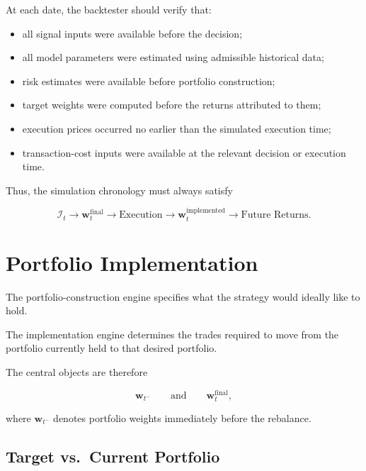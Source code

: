 \documentclass[11pt,a4paper]{article}
\begin{document}
At each date, the backtester should verify that:

\begin{itemize}
    \item all signal inputs were available before the decision;
    \item all model parameters were estimated using admissible historical data;
    \item risk estimates were available before portfolio construction;
    \item target weights were computed before the returns attributed to them;
    \item execution prices occurred no earlier than the simulated execution time;
    \item transaction-cost inputs were available at the relevant decision or
    execution time.
\end{itemize}

Thus, the simulation chronology must always satisfy

\begin{equation}
\boxed{
\mathcal{I}_t
\rightarrow
\mathbf{w}_t^{\mathrm{final}}
\rightarrow
\text{Execution}
\rightarrow
\mathbf{w}_t^{\mathrm{implemented}}
\rightarrow
\text{Future Returns}.
}
\end{equation}


\section{Portfolio Implementation}
\label{sec:portfolio_implementation}

The portfolio-construction engine specifies what the strategy would ideally
like to hold.

The implementation engine determines the trades required to move from the
portfolio currently held to that desired portfolio.

The central objects are therefore

\begin{equation}
\boxed{
\mathbf{w}_{t^-}
\qquad\text{and}\qquad
\mathbf{w}_t^{\mathrm{final}},
}
\end{equation}

where $\mathbf{w}_{t^-}$ denotes portfolio weights immediately before the
rebalance.


\subsection{Target vs.\ Current Portfolio}
\end{document}
